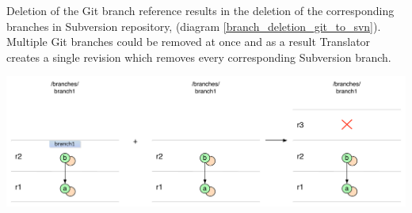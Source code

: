 Deletion of the Git branch reference results in the deletion of the corresponding branches in Subversion repository, 
(diagram \ref{branch_deletion_git_to_svn}). Multiple Git branches could be removed at once and as a result Translator 
creates a single revision which removes every corresponding Subversion branch.
\begin{center}
\includegraphics[width=\textwidth]{img/diagrams/branch_deletion_git_to_svn.pdf}%
\label{branch_deletion_git_to_svn}%
\end{center}

